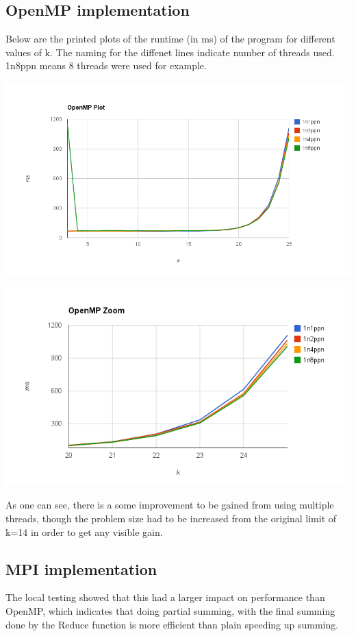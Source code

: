 \documentclass[fontsize=11pt,paper=a4,titlepage]{report}
\begin{document}
\subsection{OpenMP implementation}
Below are the printed plots of the runtime (in ms) of the program for different values of k. The naming for the diffenet lines indicate number of threads used. 1n8ppn means 8 threads were used for example.
\begin{center}
\includegraphics[scale=0.4]{chart_1.png}
\end{center}
\begin{center}
\includegraphics[scale=0.5]{chart_2.png}
\end{center}
As one can see, there is a some improvement to be gained from using multiple threads, though the problem size had to be increased from the original limit of k=14 in order to get any visible gain.

\subsection{MPI implementation}
The local testing showed that this had a larger impact on performance than OpenMP, which indicates that doing partial summing, with the final summing done by the Reduce function is more efficient than plain speeding up summing.
\end{document}
